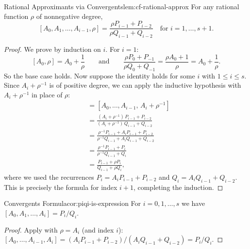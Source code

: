 \begin{Lemma}{Rational Approximants via Convergents}{lem:cf-rational-approx}
  For any rational function $\rho$ of nonnegative degree,
  $$[A_0,A_1,\dots,A_{i-1},\rho]=\frac{\rho P_{i-1}+P_{i-2}}{\rho Q_{i-1}+Q_{i-2}}\quad\text{for }i=1,\dots,s+1.$$
\end{Lemma}
\begin{proof}
  We prove by induction on $i$. For $i=1$:
  \[
    [A_0,\rho] = A_0 + \frac{1}{\rho}
    \qquad\text{and}\qquad
    \frac{\rho P_0 + P_{-1}}{\rho Q_0 + Q_{-1}} = \frac{\rho A_0 + 1}{\rho} = A_0 + \frac{1}{\rho}.
  \]
  So the base case holds. Now suppose the identity holds for some $i$ with $1\leq i\leq s$. Since $A_i+\rho^{-1}$ is of positive degree, we can apply the inductive hypothesis with $A_i+\rho^{-1}$ in place of $\rho$:
  \begin{align*}
    [A_0,\dots,A_i,\rho]
    &= [A_0,\dots,A_{i-1},\,A_i+\rho^{-1}] \\
    &= \frac{(A_i+\rho^{-1})\,P_{i-1}+P_{i-2}}{(A_i+\rho^{-1})\,Q_{i-1}+Q_{i-2}} \\
    &= \frac{\rho^{-1}P_{i-1} + A_i P_{i-1}+P_{i-2}}{\rho^{-1}Q_{i-1} + A_i Q_{i-1}+Q_{i-2}} \\
    &= \frac{\rho^{-1}P_{i-1} + P_i}{\rho^{-1}Q_{i-1} + Q_i} \\
    &= \frac{P_{i-1}+\rho P_i}{Q_{i-1}+\rho Q_i},
  \end{align*}
  where we used the recurrences $P_i = A_iP_{i-1}+P_{i-2}$ and $Q_i = A_iQ_{i-1}+Q_{i-2}$. This is precisely the formula for index $i+1$, completing the induction. 
\end{proof}

\begin{corollary}{Convergents Formula}{cor:piqi-is-expression}
  For $i=0,1,\dots,s$ we have $[A_0,A_1,\dots,A_i]=P_i/Q_i$.
\end{corollary}
\begin{proof}
  Apply  with $\rho = A_i$ (and index $i$): $[A_0,\ldots,A_{i-1},A_i] = (A_i P_{i-1}+P_{i-2})/(A_i Q_{i-1}+Q_{i-2}) = P_i/Q_i$. 
\end{proof}

